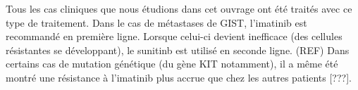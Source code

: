 \documentclass[main.tex]{subfiles}
\begin{document}
Tous les cas cliniques que nous étudions dans cet ouvrage ont été traités avec ce type de traitement. Dans le cas de métastases de GIST, l'imatinib est recommandé en première ligne. 
Lorsque celui-ci devient inefficace %
(des cellules résistantes se développant), le sunitinb est utilisé en seconde ligne. (REF)
Dans certains cas de mutation génétique (du gène KIT notamment), il a même été montré une résistance à l'imatinib plus accrue que chez les autres patients [???].

%
%
\end{document}
